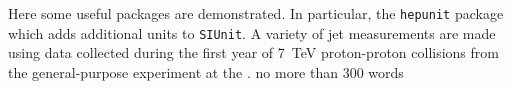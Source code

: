 Here some useful packages are demonstrated.
In particular, the \texttt{hepunit} package which adds additional units to \texttt{SIUnit}.
A variety of jet measurements are made using data collected during the first year of \SI{7}{\TeV} proton-proton collisions from the general-purpose \ATLAS experiment at the \LHC.
no more than 300 words
